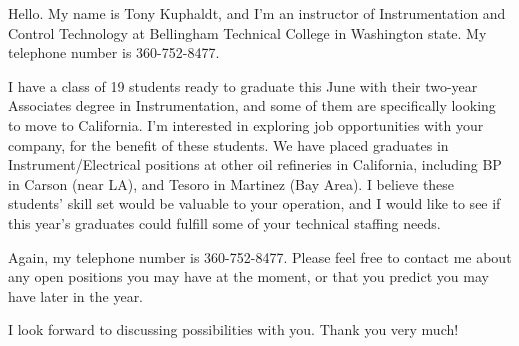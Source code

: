 \vskip 10pt {\narrower \noindent \baselineskip5pt

Hello.  My name is Tony Kuphaldt, and I'm an instructor of Instrumentation and Control Technology at Bellingham Technical College in Washington state.  My telephone number is 360-752-8477.  

I have a class of 19 students ready to graduate this June with their two-year Associates degree in Instrumentation, and some of them are specifically looking to move to California.  I'm interested in exploring job opportunities with your company, for the benefit of these students.  We have placed graduates in Instrument/Electrical positions at other oil refineries in California, including BP in Carson (near LA), and Tesoro in Martinez (Bay Area).  I believe these students' skill set would be valuable to your operation, and I would like to see if this year's graduates could fulfill some of your technical staffing needs.

Again, my telephone number is 360-752-8477.  Please feel free to contact me about any open positions you may have at the moment, or that you predict you may have later in the year.

I look forward to discussing possibilities with you.  Thank you very much!

\par} \vskip 10pt












